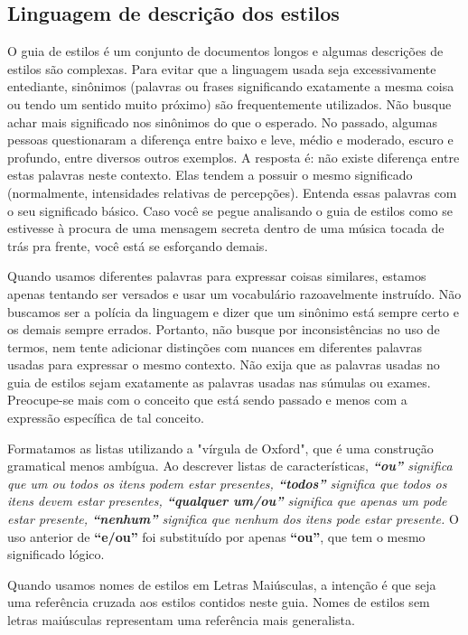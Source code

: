 \subsection*{Linguagem de descrição dos estilos}
O guia de estilos é um conjunto de documentos longos e algumas descrições de estilos são complexas. Para evitar que a linguagem usada seja excessivamente entediante, sinônimos (palavras ou frases significando exatamente a mesma coisa ou tendo um sentido muito próximo) são frequentemente utilizados. Não busque achar mais significado nos sinônimos do que o esperado. No passado, algumas pessoas questionaram a diferença entre baixo e leve, médio e moderado, escuro e profundo, entre diversos outros exemplos. A resposta é: não existe diferença entre estas palavras neste contexto. Elas tendem a possuir o mesmo significado (normalmente, intensidades relativas de percepções). Entenda essas palavras com o seu significado básico. Caso você se pegue analisando o guia de estilos como se estivesse à procura de uma mensagem secreta dentro de uma música tocada de trás pra frente, você está se esforçando demais.

Quando usamos diferentes palavras para expressar coisas similares, estamos apenas tentando ser versados e usar um vocabulário razoavelmente instruído. Não buscamos ser a polícia da linguagem e dizer que um sinônimo está sempre certo e os demais sempre errados. Portanto, não busque por inconsistências no uso de termos, nem tente adicionar distinções com nuances em diferentes palavras usadas para expressar o mesmo contexto. Não exija que as palavras usadas no guia de estilos sejam exatamente as palavras usadas nas súmulas ou exames. Preocupe-se mais com o conceito que está sendo passado e menos com a expressão específica de tal conceito.

Formatamos as listas utilizando a "vírgula de Oxford", que é uma construção gramatical menos ambígua. Ao descrever listas de características, \textit{\textbf{“ou”} significa que um ou todos os itens podem estar presentes, \textbf{“todos”} significa que todos os itens devem estar presentes, \textbf{“qualquer um/ou”} significa que apenas um pode estar presente, \textbf{“nenhum”} significa que nenhum dos itens pode estar presente.} O uso anterior de \textbf{“e/ou”} foi substituído por apenas \textbf{“ou”}, que tem o mesmo significado lógico.

Quando usamos nomes de estilos em Letras Maiúsculas, a intenção é que seja uma referência cruzada aos estilos contidos neste guia. Nomes de estilos sem letras maiúsculas representam uma referência mais generalista.

